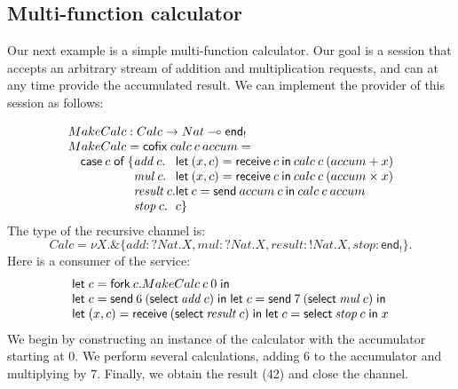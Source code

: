 \documentclass[orivec,envcountsame]{llncs}
\makeatletter
\newcommand{\with}{\mathbin\binampersand}
\newcommand{\gvout}[2]{{!#1.#2}}
\newcommand{\gvin}[2]{{?#1.#2}}
\newcommand{\lto}{\ensuremath{\multimap}}
\newcommand{\uto}{\ensuremath{\rightarrow}}
\newcommand{\outterm}{\mkwd{end}_!}
\newcommand{\interm}{\mkwd{end}_?}
\newcommand{\mkwd}[1]{\mathsf{#1}}
\newcommand{\tkwd}[1]{\textsf{#1}}
\newcommand{\clabel}[1]{\mathit{#1}}
\newcommand{\gvsend}[2]{\mkwd{send}\:#1\:#2}
\newcommand{\gvreceive}[1]{\mkwd{receive}\:#1}
\newcommand{\gvlet}[3]{\mkwd{let}\;#1 = #2\;\mkwd{in}\;#3}
\newcommand{\gvselect}[2]{\mkwd{select}\:#1\:#2}
\newcommand{\gvfork}[2]{\mkwd{fork}\:#1.#2}
\newcommand{\lrkwd}{\mkwd{cofix}}
\newcommand{\ba}{\begin{array}}
\newcommand{\ea}{\end{array}}
\newcommand{\bl}{\ba[t]{@{}l@{}}}
\newcommand{\el}{\ea}
\makeatother
\begin{document}
\subsection{Multi-function calculator}

Our next example is a simple multi-function calculator. Our goal is a session that accepts an
arbitrary stream of addition and multiplication requests, and can at any time provide the
accumulated result.  We can implement the provider of this session as follows:

\small\[
\bl
MakeCalc : Calc \uto Nat \lto \outterm \\
MakeCalc = \lrkwd\:calc\:c\:accum = \\
\quad
  \bl
  \mkwd{case}\:c\;\mkwd{of}\:\{
    \ba[t]{@{}l@{}l@{}}
    \clabel{add}\:c.
      & \mkwd{let}\:(x,c) = \gvreceive{c} \: \mkwd{in}\:
      calc\:c\:(accum + x) \\
    \clabel{mul}\:c.
      & \mkwd{let}\:(x,c) = \gvreceive{c}\:\mkwd{in}\:
      calc\:c\:(accum \times x) \\
    \clabel{result}\:c.
      & \mkwd{let}\:c = \gvsend{accum}{c}\:\mkwd{in}\:
        calc\:c\:accum \\
    \clabel{stop}\:c.& c \}
    \ea \\
  \el \\
\el
\]\normalsize
The type of the recursive channel is:
\small\[
 Calc = \nu X. \with \{ \clabel{add}: \gvin{Nat}{X},
                        \clabel{mul}: \gvin{Nat}{X},
                        \clabel{result}: \gvout{Nat}{X},
                        \clabel{stop}: \outterm \}.
\]%
Here is a consumer of the service:
\small\[
\bl
  \gvlet{c}{\gvfork{c}{MakeCalc\:c\:0}}{} \\
  \gvlet{c}{\gvsend{6}{(\gvselect{\clabel{add}}{c})}}{
  \gvlet{c}{\gvsend{7}{(\gvselect{\clabel{mul}}{c})}}{}} \\
  \gvlet{(x,c)}{\gvreceive{(\gvselect{\clabel{result}}{c})}}{
  \gvlet{c}{\gvselect{\clabel{stop}}{c}}{x}}
\el
\]\normalsize
We begin by constructing an instance of the calculator with the accumulator starting at 0. %
We perform several calculations, adding 6 to the accumulator and multiplying by 7.  Finally, we
obtain the result (42) and close the channel.
\end{document}
